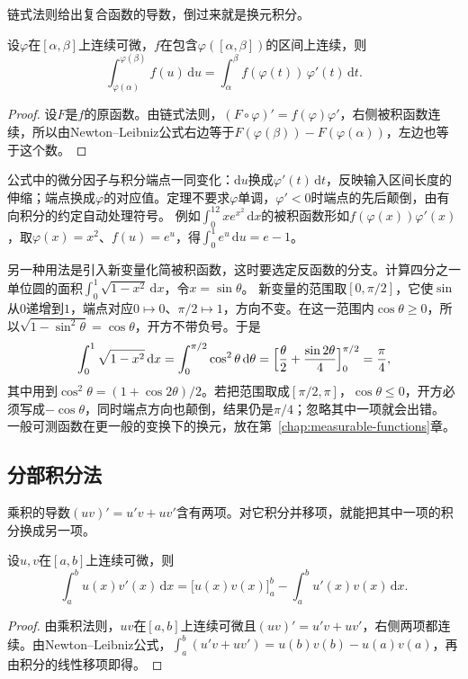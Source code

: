 链式法则给出复合函数的导数，倒过来就是换元积分。
\begin{theorem}[换元公式]
\label{thm:ru-substitution}
设$\varphi$在$[\alpha,\beta]$上连续可微，$f$在包含$\varphi([\alpha,\beta])$的区间上连续，则
\[
 \int_{\varphi(\alpha)}^{\varphi(\beta)}f(u)\,\mathrm du=\int_\alpha^\beta f(\varphi(t))\,\varphi'(t)\,\mathrm dt.
\]
\end{theorem}
\begin{proof}
设$F$是$f$的原函数。由链式法则，$(F\circ\varphi)'=f(\varphi)\varphi'$，右侧被积函数连续，所以由Newton--Leibniz公式右边等于$F(\varphi(\beta))-F(\varphi(\alpha))$，左边也等于这个数。
\end{proof}
公式中的微分因子与积分端点一同变化：$\mathrm du$换成$\varphi'(t)\,\mathrm dt$，反映输入区间长度的伸缩；端点换成$\varphi$的对应值。定理不要求$\varphi$单调，$\varphi'<0$时端点的先后颠倒，由有向积分的约定自动处理符号。
例如$\int_0^12xe^{x^2}\,\mathrm dx$的被积函数形如$f(\varphi(x))\varphi'(x)$，取$\varphi(x)=x^2$、$f(u)=e^u$，得$\int_0^1e^u\,\mathrm du=e-1$。

另一种用法是引入新变量化简被积函数，这时要选定反函数的分支。计算四分之一单位圆的面积$\int_0^1\sqrt{1-x^2}\,\mathrm dx$，令$x=\sin\theta$。
新变量的范围取$[0,\pi/2]$，它使$\sin$从$0$递增到$1$，端点对应$0\mapsto0$、$\pi/2\mapsto1$，方向不变。在这一范围内$\cos\theta\geq0$，所以$\sqrt{1-\sin^2\theta}=\cos\theta$，开方不带负号。于是
\[
 \int_0^1\sqrt{1-x^2}\,\mathrm dx=\int_0^{\pi/2}\cos^2\theta\,\mathrm d\theta=\Bigl[\frac\theta2+\frac{\sin2\theta}4\Bigr]_0^{\pi/2}=\frac\pi4,
\]
其中用到$\cos^2\theta=(1+\cos2\theta)/2$。若把范围取成$[\pi/2,\pi]$，$\cos\theta\leq0$，开方必须写成$-\cos\theta$，同时端点方向也颠倒，结果仍是$\pi/4$；忽略其中一项就会出错。
一般可测函数在更一般的变换下的换元，放在第~\ref{chap:measurable-functions}章。

\subsection{分部积分法}
\label{sec:ru-integration-by-parts}

乘积的导数$(uv)'=u'v+uv'$含有两项。对它积分并移项，就能把其中一项的积分换成另一项。
\begin{theorem}[分部积分公式]
\label{thm:ru-integration-by-parts}
设$u,v$在$[a,b]$上连续可微，则
\[
 \int_a^bu(x)v'(x)\,\mathrm dx=\bigl[u(x)v(x)\bigr]_a^b-\int_a^bu'(x)v(x)\,\mathrm dx.
\]
\end{theorem}
\begin{proof}
由乘积法则，$uv$在$[a,b]$上连续可微且$(uv)'=u'v+uv'$，右侧两项都连续。由Newton--Leibniz公式，$\int_a^b(u'v+uv')=u(b)v(b)-u(a)v(a)$，再由积分的线性移项即得。
\end{proof}

